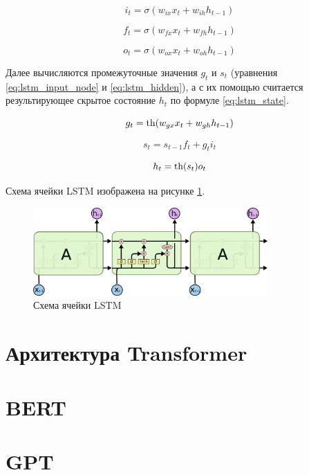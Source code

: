 \begin{equation}
    \label{eq:lstm_input}
    i_t = \sigma(w_{ix}x_t+w_{ih}h_{t-1})
\end{equation}

\begin{equation}
    \label{eq:lstm_forget}
    f_t = \sigma(w_{fx}x_t+w_{fh}h_{t-1})
\end{equation}

\begin{equation}
    \label{eq:lstm_output}
    o_t = \sigma(w_{ox}x_t+w_{oh}h_{t-1})
\end{equation}

Далее вычисляются промежуточные значения $g_t$ и $s_t$ (уравнения \ref*{eq:lstm_input_node} и \ref*{eq:lstm_hidden}), а с их помощью считается результирующее скрытое состояние $h_t$ по формуле \ref*{eq:lstm_state}.

\begin{equation}
    \label{eq:lstm_input_node}
    g_t = \operatorname{th}(w_{gx}x_t+w_{gh}h_{t-1})
\end{equation}

\begin{equation}
    \label{eq:lstm_hidden}
    s_t = s_{t-1}f_t+g_ti_t
\end{equation}

\begin{equation}
    \label{eq:lstm_state}
    h_t = \operatorname{th}(s_t)o_t
\end{equation}

Схема ячейки LSTM изображена на рисунке \ref*{fig:lstm}.

\begin{figure}
    \centering
    \includegraphics[width=0.8\textwidth]{../inc/images/lstm.png}
    \caption{Схема ячейки LSTM}
    \label{fig:lstm}
\end{figure}

\section{Архитектура Transformer}

\section{BERT}

\section{GPT}